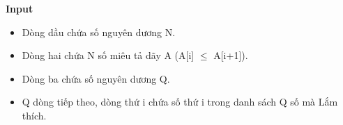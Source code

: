 \textbf{Input}
\begin{itemize}
	\item Dòng dầu chứa số nguyên dương N.
	\item Dòng hai chứa N số miêu tả dãy A (A[i]  $\le$  A[i+1]).
	\item Dòng ba chứa số nguyên dương Q.
	\item Q dòng tiếp theo, dòng thứ i chứa số thứ i trong danh sách Q số mà Lắm thích.
\end{itemize}